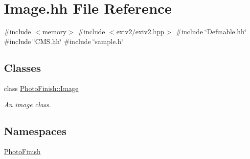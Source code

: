 \hypertarget{_image_8hh}{}\section{Image.\+hh File Reference}
\label{_image_8hh}
{\ttfamily \#include $<$memory$>$}\newline
{\ttfamily \#include $<$exiv2/exiv2.\+hpp$>$}\newline
{\ttfamily \#include \char`\"{}Definable.\+hh\char`\"{}}\newline
{\ttfamily \#include \char`\"{}C\+M\+S.\+hh\char`\"{}}\newline
{\ttfamily \#include \char`\"{}sample.\+h\char`\"{}}\newline
\subsection*{Classes}
\begin{DoxyCompactItemize}
\item 
class \hyperlink{class_photo_finish_1_1_image}{Photo\+Finish\+::\+Image}
\begin{DoxyCompactList}\small\item\em An image class. \end{DoxyCompactList}\end{DoxyCompactItemize}
\subsection*{Namespaces}
\begin{DoxyCompactItemize}
\item 
 \hyperlink{namespace_photo_finish}{Photo\+Finish}
\end{DoxyCompactItemize}
